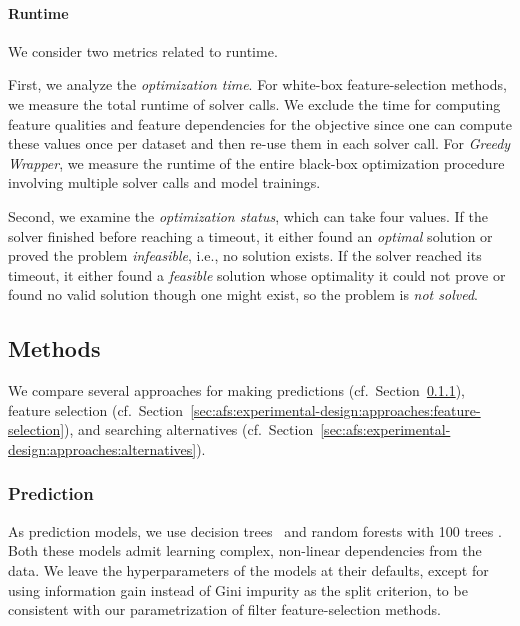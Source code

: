\documentclass{article}
\theoremstyle{definition}
\begin{document}
\paragraph{Runtime}

We consider two metrics related to runtime.

First, we analyze the \emph{optimization time}.
For white-box feature-selection methods, we measure the total runtime of solver calls.
We exclude the time for computing feature qualities and feature dependencies for the objective since one can compute these values once per dataset and then re-use them in each solver call.
For \emph{Greedy Wrapper}, we measure the runtime of the entire black-box optimization procedure involving multiple solver calls and model trainings.

Second, we examine the \emph{optimization status}, which can take four values.
If the solver finished before reaching a timeout, it either found an \emph{optimal} solution or proved the problem \emph{infeasible}, i.e., no solution exists.
If the solver reached its timeout, it either found a \emph{feasible} solution whose optimality it could not prove or found no valid solution though one might exist, so the problem is \emph{not solved}.

\subsection{Methods}
\label{sec:afs:experimental-design:approaches}

We compare several approaches for making predictions (cf.~Section~\ref{sec:afs:experimental-design:approaches:prediction}), feature selection (cf.~Section~\ref{sec:afs:experimental-design:approaches:feature-selection}), and searching alternatives (cf.~Section~\ref{sec:afs:experimental-design:approaches:alternatives}).

\subsubsection{Prediction}
\label{sec:afs:experimental-design:approaches:prediction}

As prediction models, we use decision trees~\cite{breiman1984classification} and random forests with 100 trees \cite{breiman2001random}.
Both these models admit learning complex, non-linear dependencies from the data.
We leave the hyperparameters of the models at their defaults, except for using information gain instead of Gini impurity as the split criterion, to be consistent with our parametrization of filter feature-selection methods.
\end{document}
